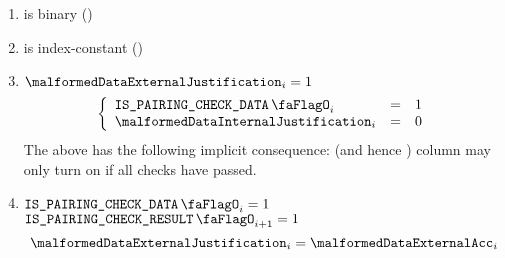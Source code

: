 \begin{enumerate}[resume]
    \item \malformedDataExternalJustification{} is binary \quad (\trash)
    \item \malformedDataExternalJustification{} is index-constant \quad (\trash)
    \item \If $\malformedDataExternalJustification_{i} = 1$ \Then
          \[
              \left\{ \begin{array}{lcl}
                  \isBlsPairingCheckData      _{i} & = & 1 \\
                  \malformedDataInternalJustification _{i} & = & 0 \\
              \end{array} \right.
          \]
          \saNote{} The above has the following implicit consequence: \malformedDataExternalAcc{} (and hence \malformedDataExternalBit{}) column may only turn on if all checks have passed.
    \item \If $\isBlsPairingCheckData _{i} = 1$ \et $\isBlsPairingCheckResult _{i + 1} = 1$ \Then
          \[
              \malformedDataExternalJustification_{i} = \malformedDataExternalAcc _{i}
          \]
\end{enumerate}
